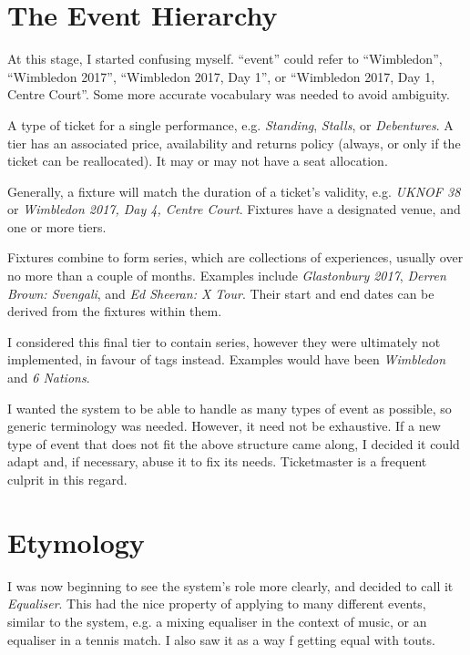 \documentclass[12pt,a4]{bhamdissertation}
\begin{document}
\section{The Event Hierarchy}

At this stage, I started confusing myself. ``event'' could refer to ``Wimbledon'', ``Wimbledon 2017'', ``Wimbledon 2017, Day 1'', or ``Wimbledon 2017, Day 1, Centre Court''. Some more accurate vocabulary was needed to avoid ambiguity.

\begin{description}[style=nextline]
    \item[Tiers] A type of ticket for a single performance, e.g. \textit{Standing}, \textit{Stalls}, or \textit{Debentures}. A tier has an associated price, availability and returns policy (always, or only if the ticket can be reallocated). It may or may not have a seat allocation.
    \item[Fixtures] Generally, a fixture will match the duration of a ticket's validity, e.g. \textit{UKNOF 38} or \textit{Wimbledon 2017, Day 4, Centre Court}. Fixtures have a designated venue, and one or more tiers.
    \item[Series] Fixtures combine to form series, which are collections of experiences, usually over no more than a couple of months. Examples include \textit{Glastonbury 2017}, \textit{Derren Brown: Svengali}, and \textit{Ed Sheeran: X Tour}. Their start and end dates can be derived from the fixtures within them.
    \item[Headlines] I considered this final tier to contain series, however they were ultimately not implemented, in favour of tags instead. Examples would have been \textit{Wimbledon} and \textit{6 Nations}.
\end{description}

I wanted the system to be able to handle as many types of event as possible, so generic terminology was needed. However, it need not be exhaustive. If a new type of event that does not fit the above structure came along, I decided it could adapt and, if necessary, abuse it to fix its needs. Ticketmaster is a frequent culprit in this regard.

\section{Etymology}

I was now beginning to see the system's role more clearly, and decided to call it \textit{Equaliser}. This had the nice property of applying to many different events, similar to the system, e.g. a mixing equaliser in the context of music, or an equaliser in a tennis match. I also saw it as a way f getting equal with touts.
\end{document}
